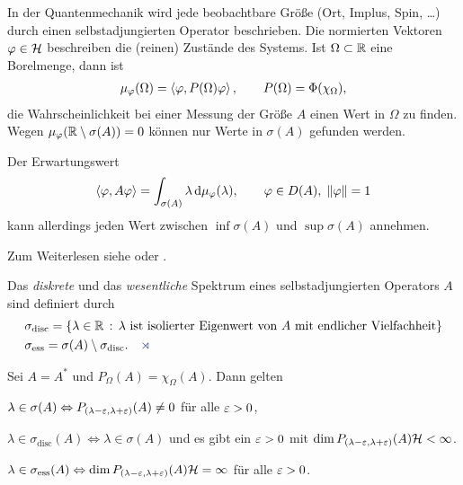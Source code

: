 \begin{bem*}[Bemerkungen.]
\begin{bemenum}
\item In der Quantenmechanik wird jede beobachtbare Größe (Ort, Implus, Spin,
\ldots) durch einen selbstadjungierten Operator beschrieben. Die normierten
Vektoren $\varphi\in \mathcal{H}$ beschreiben die (reinen) Zustände des Systems. Ist
$\Omega\subset\mathbb{R}$ eine Borelmenge, dann ist
\begin{align*}
\mu_\varphi(\Omega) = \left\langle\varphi,P(\Omega)\varphi\right\rangle,\qquad P(\Omega) = \Phi(\chi_\Omega), 
\end{align*}
die Wahrscheinlichkeit bei einer Messung der Größe $A$ einen Wert in $\Omega$ zu
finden. Wegen $\mu_\varphi(\mathbb{R}\setminus\sigma(A)) = 0$ können nur Werte in
$\sigma(A)$ gefunden werden.

Der Erwartungswert
\begin{align*}
\left\langle\varphi,A\varphi\right\rangle = \int_{\sigma(A)} \lambda\,\mathrm{d} \mu_\varphi(\lambda),\qquad \varphi\in D(A),\;
\left\|\varphi\right\| = 1
\end{align*}
kann allerdings jeden Wert zwischen $\inf \sigma(A)$ und $\sup \sigma(A)$
annehmen.

Zum Weiterlesen siehe \cite{Stra} oder \cite{Thi94}.\maphere
\end{bemenum}
\end{bem*}

\begin{defn*}
\newcommand{\disc}{{\mathrm{disc}}}
\newcommand{\ess}{{\mathrm{ess}}}
Das \emph{diskrete} und das \emph{wesentliche} Spektrum eines selbstadjungierten
Operators $A$ sind definiert durch
\begin{align*}
&\sigma_\disc = \setdef{\lambda\in\R}{\lambda\text{ ist isolierter Eigenwert
von $A$ mit endlicher Vielfachheit}}\\
&\sigma_\ess = \sigma(A)\setminus \sigma_\disc.\fishhere
\end{align*}
\end{defn*}

\begin{prop}
\label{prop:6.11}
Sei $A=A^*$ und $P_\Omega(A) = \chi_\Omega(A)$. Dann gelten
\begin{propenum}
\item $\lambda\in\sigma(A) \Leftrightarrow P_{(\lambda-\varepsilon,\lambda+\varepsilon)}(A)\neq
0$ für alle $\varepsilon > 0$,
\item $\lambda\in \sigma_\mathrm{disc}(A) \Leftrightarrow \lambda\in \sigma(A)$
und es gibt ein $\varepsilon > 0$ mit $\dim P_{(\lambda-\varepsilon,\lambda+\varepsilon)}(A)\mathcal{H} <
\infty$.
\item $\lambda\in\sigma_{\mathrm{ess}}(A) \Leftrightarrow \dim
P_{(\lambda-\varepsilon,\lambda + \varepsilon)}(A)\mathcal{H} = \infty$ für alle $\varepsilon > 0$.\fishhere
\end{propenum}
\end{prop}

